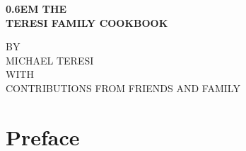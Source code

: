 \documentclass{family_cookbook}
\begin{document}
\frontmatter
{}

\begin{titlepage}


\onecolumn
\pagestyle{empty}
\newcommand\nbvspace[1][3]{\vspace*{\stretch{#1}}}
\newcommand\nbstretchyspace{\spaceskip0.5em plus 0.25em minus 0.25em}
\newcommand{\nbtitlestretch}{\spaceskip0.6em}

{%
	\centering
	\bfseries
	\uppercase{%
		\nbtitlestretch%
		\large{the}\\ \vspace{1em}
		\Huge{teresi family cookbook}
	}
	\nbvspace[1]

	\large{BY}\\
	\vspace{1ex}
	\Large{MICHAEL TERESI}\\
	\nbvspace[1]
	\small{WITH}\\
	\vspace{1ex}
	\small{CONTRIBUTIONS FROM FRIENDS AND FAMILY}\\
	\nbvspace[1]

	\vfill

}
\end{titlepage}
\restoregeometry

\dominitoc%
\nomtcrule%


\tableofcontents


\chapter*{Preface}
\enlargethispage{5\baselineskip}  %


\clearpage


\mainmatter%


\setcounter{mtc}{0}  %
\mtcaddchapter%
\end{document}
